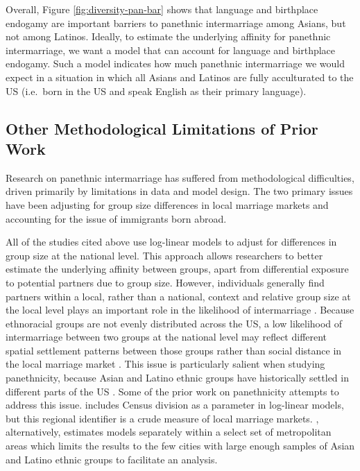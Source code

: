 \documentclass[11pt,]{article}
\begin{document}
Overall, Figure \ref{fig:diversity-pan-bar} shows that language and birthplace endogamy are important barriers to panethnic intermarriage among Asians, but not among Latinos. Ideally, to estimate the underlying affinity for panethnic intermarriage, we want a model that can account for language and birthplace endogamy. Such a model indicates how much panethnic intermarriage we would expect in a situation in which all Asians and Latinos are fully acculturated to the US (i.e.~born in the US and speak English as their primary language).

\hypertarget{other-methodological-limitations-of-prior-work}{%
\subsection{Other Methodological Limitations of Prior Work}\label{other-methodological-limitations-of-prior-work}}

Research on panethnic intermarriage has suffered from methodological difficulties, driven primarily by limitations in data and model design. The two primary issues have been adjusting for group size differences in local marriage markets and accounting for the issue of immigrants born abroad.

All of the studies cited above use log-linear models to adjust for differences in group size at the national level. This approach allows researchers to better estimate the underlying affinity between groups, apart from differential exposure to potential partners due to group size. However, individuals generally find partners within a local, rather than a national, context and relative group size at the local level plays an important role in the likelihood of intermarriage \citep{choi_marriagemarket_2017}. Because ethnoracial groups are not evenly distributed across the US, a low likelihood of intermarriage between two groups at the national level may reflect different spatial settlement patterns between those groups rather than social distance in the local marriage market \citep{harris_how_2005}. This issue is particularly salient when studying panethnicity, because Asian and Latino ethnic groups have historically settled in different parts of the US \citep{massey_geographic_2008}. Some of the prior work on panethnicity attempts to address this issue. \citet{fu_how_2007a} includes Census division as a parameter in log-linear models, but this regional identifier is a crude measure of local marriage markets. \citet{rosenfeld_salience_2001}, alternatively, estimates models separately within a select set of metropolitan areas which limits the results to the few cities with large enough samples of Asian and Latino ethnic groups to facilitate an analysis.
\end{document}
